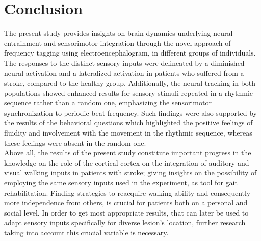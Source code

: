 \chapter{Conclusion}
The present study provides insights on brain dynamics underlying neural entrainment and sensorimotor integration through the novel approach of frequency tagging using electroencephalogram, in different groups of individuals. The responses to the distinct sensory inputs were delineated by a diminished neural activation and a lateralized activation in patients who suffered from a stroke, compared to the healthy group. Additionally, the neural tracking in both populations showed enhanced results for sensory stimuli repeated in a rhythmic sequence rather than a random one, emphasizing the sensorimotor synchronization to periodic beat frequency. Such findings were also supported by the results of the behavioral questions which highlighted the positive feelings of fluidity and involvement with the movement in the rhythmic sequence, whereas these feelings were absent in the random one. \\
Above all, the results of the present study constitute important progress in the knowledge on the role of the cortical cortex on the integration of auditory and visual walking inputs in patients with stroke; giving insights on the possibility of employing the same sensory inputs used in the experiment, as tool for gait rehabilitation. Finding strategies to reacquire walking ability and consequently more independence from others, is crucial for patients both on a personal and social level. In order to get most appropriate results, that can later be used to adapt sensory inputs specifically for diverse lesion's location, further research taking into account this crucial variable is necessary.